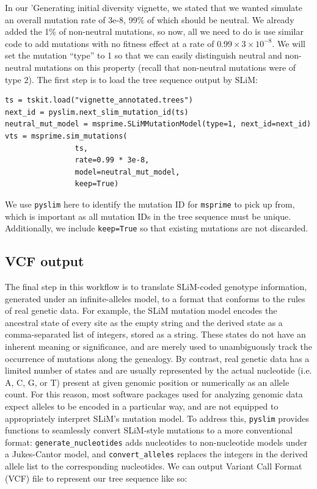 \documentclass[12pt]{article}
\newcommand{\msprime}[0]{\texttt{msprime}\xspace}
\newcommand{\pyslim}[0]{\texttt{pyslim}\xspace}
\begin{document}
In our 'Generating initial diversity vignette, we stated that we wanted simulate an overall mutation rate of 3e-8, 99\% of which should be neutral.
We already added the 1\% of non-neutral mutations, so now, all we need to do is use similar code to add mutations with no fitness effect at
a rate of $0.99 \times 3 \times10^{-8}$. We will set the mutation ``type'' to 1 so that we can easily distinguish neutral and non-neutral
mutations on this property (recall that non-neutral mutations were of type 2). The first step is to load the tree sequence output by SLiM:
   
\begin{verbatim}
ts = tskit.load("vignette_annotated.trees")
next_id = pyslim.next_slim_mutation_id(ts)
neutral_mut_model = msprime.SLiMMutationModel(type=1, next_id=next_id)
vts = msprime.sim_mutations(
                ts,
                rate=0.99 * 3e-8,
                model=neutral_mut_model,
                keep=True)
\end{verbatim}

We use \pyslim here to identify the mutation ID for \msprime to pick up from, which is important as all mutation IDs in the tree sequence must be unique.
Additionally, we include \verb|keep=True| so that existing mutations are not discarded.

\subsection*{VCF output}

The final step in this workflow is to translate SLiM-coded genotype information, generated under an infinite-alleles model, to a format that conforms to
the rules of real genetic data. For example, the SLiM mutation model encodes the ancestral state of every site as the empty string and the derived state
as a comma-separated list of integers, stored as a string. These states do not have an inherent meaning or significance, and are merely used to unambiguously
track the occurrence of mutations along the genealogy. By contrast, real genetic data has a limited number of states and are usually represented
by the actual nucleotide (i.e. A, C, G, or T) present at given genomic position or numerically as an allele count. For this reason, most software packages used
for analyzing genomic data expect alleles to be encoded in a particular way, and are not equipped to appropriately interpret SLiM's mutation model.
To address this, \pyslim provides functions to seamlessly convert SLiM-style mutations to a more conventional format: \verb|generate_nucleotides| adds
nucleotides to non-nucleotide models under a Jukes-Cantor model, and \verb|convert_alleles| replaces the integers in the derived allele list to the corresponding
nucleotides. We can output Variant Call Format (VCF) file to represent our tree sequence like so:
\end{document}
